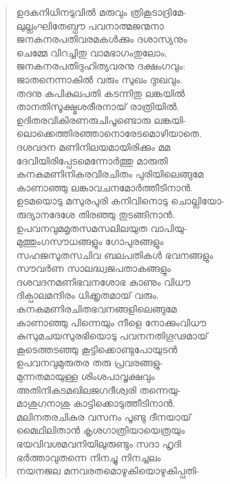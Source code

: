 \begin{verse}
ഉദകനിധിനടുവില്‍ മരുവും ത്രികൂടാദ്രിമേ-\\
ലുല്ലംഘിതേബ്ധൗ പവനാത്മജന്മനാ\\
ജനകനരപതിവരമകള്‍ക്കും ദശാസ്യനും\\
ചെമ്മേ വിറച്ചിതു വാമഭാഗംതുലോം,\\
ജനകനരപതിദുഹിത്യവരനു ദക്ഷംഗവും:\\
ജാതനെന്നാകില്‍ വരും സുഖം ദുഃഖവും.\\
തദനു കപികുലപതി കടന്നിതു ലങ്കയില്‍\\
താനതിസൂക്ഷ്മശരീരനായ് രാത്രിയില്‍.\\
ഉദിതരവികിരണരുചിപൂണ്ടൊരു ലങ്കയി-\\
ലൊക്കെത്തിരഞ്ഞാനൊരേടമൊഴിയാതെ.\\
ദശവദന  മണിനിലയമായിരിക്കും മമ\\
ദേവിയിരിപ്പേടമെന്നോര്‍ത്തു മാരുതി\\
കനകമണിനികരവിരചിതം പുരിയിലെങ്ങുമേ\\
കാണാഞ്ഞു ലങ്കാവചനമോര്‍ത്തീടിനാന്‍.\\
ഉടമയൊടു മസുരപുരി കനിവിനൊടു ചൊല്ലിയോ-\\
രുദ്യാനദേശേ തിരഞ്ഞു തുടങ്ങിനാന്‍.\\
ഉപവനവുമമൃതസമസലിലയുത വാപിയു-\\
മുത്തുംഗസൗധങ്ങളും ഗോപുരങ്ങളും\\
സഹജസുതസചിവ ബലപതികള്‍ ഭവനങ്ങളും\\
സൗവര്‍ണ സാലദ്ധ്വജപതാകങ്ങളും\\
ദശവദനമണിഭവനശോഭ കാണും വിധൗ\\
ദിക്പാലമന്ദിരം ധിക്കൃതമായ് വരും.\\
കനകമണിരചിതഭവനങ്ങളിലെങ്ങുമേ\\
കാണാഞ്ഞു പിന്നെയും നീളെ നോക്കുംവിധൗ\\
കുസുമചയസുരഭിയൊടു പവനനതിഗൂഢമായ്\\
കൂടെത്തടഞ്ഞു കൂട്ടിക്കൊണ്ടുപോയുടന്‍\\
ഉപവനവുമുരുതര തരു പ്രവരങ്ങളു-\\
മുന്നതമായുള്ള ശിംശപാവൃക്ഷവും\\
അതിനികടമഖിലജഗദീശ്വരി തന്നെയു-\\
മാശുഗനാശു കാട്ടിക്കൊടുത്തീടിനാന്‍.\\
മലിനതരചികുര വസനം പൂണ്ടു ദീനയായ്\\
മൈഥിലിതാന്‍ കൃശഗാത്രിയായെത്രയും\\
ഭയവിവശമവനിയിലുരുണ്ടും സദാ ഹൃദി\\
ഭര്‍ത്താവുതന്നെ നിനച്ചു നിനച്ചലം\\
നയനജല മനവരതമൊഴുകിയൊഴുകിപ്പതി-\\

\end{verse}
